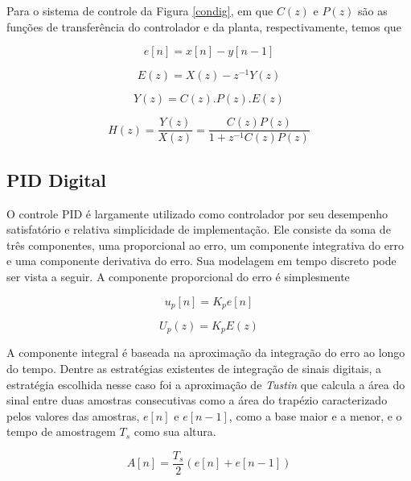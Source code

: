 Para o sistema de controle da Figura \ref{condig}, em que $C(z)$ e $P(z)$ são as funções de transferência do controlador e da planta, respectivamente, temos que

\begin{equation}
    \label{eq:cd_2}
    e[n] = x[n] - y[n-1]
\end{equation}

\begin{equation}
    \label{eq:cd_3}
    E(z) = X(z) - z^{-1}Y(z)
\end{equation}

\begin{equation}
    \label{eq:cd_4}
    Y(z) = C(z).P(z).E(z)
\end{equation}

\begin{equation}
    \label{eq:cd_5}
    H(z) = \frac{Y(z)}{X(z)} = \frac{C(z)P(z)}{1+z^{-1}C(z)P(z)}
\end{equation}

\subsection{PID Digital}

O controle \acf{PID} é largamente utilizado como controlador por seu desempenho satisfatório e relativa simplicidade de implementação. Ele consiste da soma de três componentes, uma proporcional ao erro, um componente integrativa do erro e uma componente derivativa do erro. Sua modelagem em tempo discreto pode ser vista a seguir. A componente proporcional do erro é simplesmente

\begin{equation}
    \label{eq:cd_6}
    u_p[n] = K_pe[n]
\end{equation}

\begin{equation}
    \label{eq:cd_6.1}
    U_p(z) = K_pE(z)
\end{equation}

A componente integral é baseada na aproximação da integração do erro ao longo do tempo. Dentre as estratégias existentes de integração de sinais digitais, a estratégia escolhida nesse caso foi a aproximação de \textit{Tustin} que calcula a área do sinal entre duas amostras consecutivas como a área do trapézio caracterizado pelos valores das amostras, $e[n]$ e $e[n-1]$, como a base maior e a menor, e o tempo de amostragem $T_s$ como sua altura.

\begin{equation}
    \label{eq:cd_7}
    A[n] = \frac{T_s}{2} (e[n]+e[n-1])
\end{equation}

